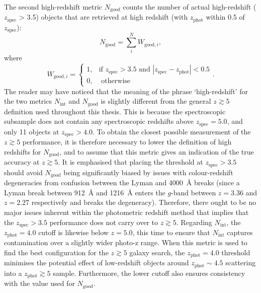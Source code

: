 \begin{enumerate}[label=(\roman*)]
  The second high-redshift metric $N_{\mathrm{good}}$ counts the number of actual high-redshift ($z_{\mathrm{spec}}$ > 3.5) objects that are retrieved at high redshift (with $z_{\mathrm{phot}}$ within 0.5 of $z_{\mathrm{spec}}$):
  \begin{equation}
      N_{\mathrm{good}} = \sum^{N}_{i}{W_{\mathrm{good},i}},\label{eqn:N_good}
  \end{equation}
  where
    \[
  W_{\mathrm{good},i} =
  \begin{cases}
  1, & \text{if } z_{\mathrm{spec}}>3.5 \text{ and } \left| z_{\mathrm{spec}} - z_{\mathrm{phot}} \right| < 0.5 \\
  0, & \text{ otherwise} 
  \end{cases}.
  \]  
  The reader may have noticed that the meaning of the phrase `high-redshift' for the two metrics $N_{\mathrm{int}}$ and $N_{\mathrm{good}}$ is slightly different from the general $z\gtrsim5$ definition used throughout this thesis. This is because the spectroscopic subsample does not contain any spectroscopic redshifts above $z_{\mathrm{spec}}=5.0$, and only 11 objects at $z_{\mathrm{spec}}>4.0$. To obtain the closest possible measurement of the $z\gtrsim5$ performance, it is therefore necessary to lower the definition of high redshifts for $N_{\mathrm{good}}$, and to assume that this metric gives an indication of the true accuracy at $z\gtrsim5$. It is emphasised that placing the threshold at $z_{\mathrm{spec}}>3.5$ should avoid $N_{\mathrm{good}}$ being significantly biased by issues with colour-redshift degeneracies from confusion between the Lyman and \SI{4000}{\angstrom} breaks (since a Lyman break between \SI{912}{\angstrom} and \SI{1216}{\angstrom} enters the $g$-band between $z=3.36$ and $z=2.27$ respectively and breaks the degeneracy). Therefore, there ought to be no major issues inherent within the photometric redshift method that implies that the $z_{\mathrm{spec}}>3.5$  performance does not carry over to $z\gtrsim5$. Regarding $N_{\mathrm{int}}$, the $z_{\mathrm{phot}}=4.0$ cutoff is likewise below $z=5.0$, this time to ensure that $N_{\mathrm{int}}$ captures contamination over a slightly wider photo-z range.  When this metric is used to find the best configuration for the $z\gtrsim5$ galaxy search, the $z_{\mathrm{phot}}=4.0$ threshold minimises the potential effect of low-redshift objects around $z_{\mathrm{phot}} \sim 4.5$ scattering into a $z_{\mathrm{phot}}\gtrsim5$ sample. Furthermore, the lower cutoff also ensures consistency with the value used for $N_{\mathrm{good}}$. 
  
  
\end{enumerate}


